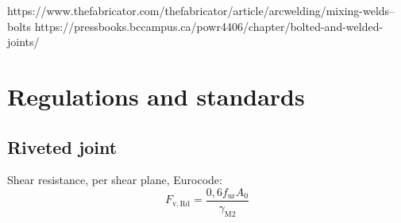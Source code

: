 https://www.thefabricator.com/thefabricator/article/arcwelding/mixing-welds--bolts
https://pressbooks.bccampus.ca/powr4406/chapter/bolted-and-welded-joints/

\section{Regulations and standards}

\subsection{Riveted joint}

Shear resistance, per shear plane, Eurocode:
\begin{equation}
F_{\mathrm{v}, \mathrm{Rd}}=\frac{0,6 f_{\mathrm{ur}} A_0}{\gamma_{\mathrm{M} 2}}
\end{equation}